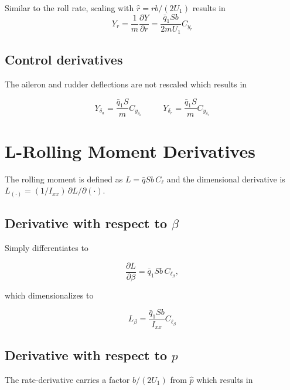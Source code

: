 \documentclass[11pt]{article}
\newcommand{\qbar}{\bar{q}}
\newcommand{\Ixx}{I_{xx}}
\newcommand{\dd}[2]{\dfrac{\partial #1}{\partial #2}}
\begin{document}
Similar to the roll rate, scaling with $\hat r = rb/(2U_1)$ results in
\begin{equation}\label{eq:equation_38}
\boxed{\;Y_r = \frac{1}{m}\dd{Y}{r} = \frac{\qbar_1 S b}{2mU_1}C_{y_r}\;}
\end{equation}

\subsection{Control derivatives}

The aileron and rudder deflections are not rescaled which results in

\begin{equation}\label{eq:equation_39}
\boxed{\;Y_{\delta_a} = \frac{\qbar_1 S}{m}C_{y_{\delta_a}}\;}
\qquad
\boxed{\;Y_{\delta_r} = \frac{\qbar_1 S}{m}C_{y_{\delta_r}}\;}
\end{equation}

\section{L-Rolling Moment Derivatives}

The rolling moment is defined as $L = \qbar S b\,C_\ell$ and the dimensional derivative is
$L_{(\cdot)} = (1/\Ixx)\,\partial L/\partial(\cdot)$.

\subsection{Derivative with respect to $\beta$}

Simply differentiates to

\begin{equation}\label{eq:equation_40}
\dd{L}{\beta} = \qbar_1 S b\,C_{\ell_\beta},
\end{equation}

which dimensionalizes to

\begin{equation}\label{eq:equation_41}
\boxed{\;L_\beta = \frac{\qbar_1 S b}{\Ixx}C_{\ell_\beta}\;}
\end{equation}

\subsection{Derivative with respect to $p$}

The rate-derivative carries a factor $b/(2U_1)$ from $\hat p$ which results in
\end{document}
